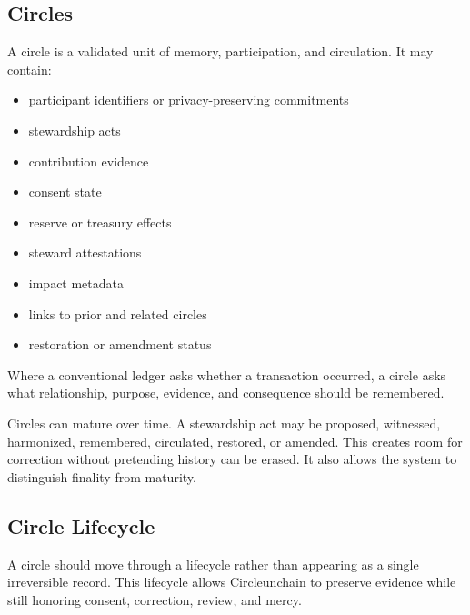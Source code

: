 \documentclass[12pt]{article}
\begin{document}

\subsection{Circles}

A circle is a validated unit of memory, participation, and circulation. It may contain:

\begin{itemize}
  \item participant identifiers or privacy-preserving commitments
  \item stewardship acts
  \item contribution evidence
  \item consent state
  \item reserve or treasury effects
  \item steward attestations
  \item impact metadata
  \item links to prior and related circles
  \item restoration or amendment status
\end{itemize}

Where a conventional ledger asks whether a transaction occurred, a circle asks what relationship, purpose, evidence, and consequence should be remembered.

Circles can mature over time. A stewardship act may be proposed, witnessed, harmonized, remembered, circulated, restored, or amended. This creates room for correction without pretending history can be erased. It also allows the system to distinguish finality from maturity.

\subsection{Circle Lifecycle}

A circle should move through a lifecycle rather than appearing as a single irreversible record. This lifecycle allows Circleunchain to preserve evidence while still honoring consent, correction, review, and mercy.
\end{document}
